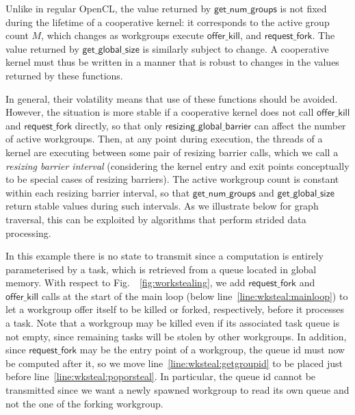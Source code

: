 \documentclass[parskip=half,sigconf,review, anonymous=true, acmcopyrightmode=none]{acmart}
\newcommand{\myfig}{Fig.~}
\newcommand{\offerfork}{\mathsf{request\_fork}}
\newcommand{\offerkill}{\mathsf{offer\_kill}}
\newcommand{\resizingglobalbarrier}{\mathsf{resizing\_global\_barrier}}
\newcommand{\getnumgroups}{\mathsf{get\_num\_groups}}
\newcommand{\getglobalsize}{\mathsf{get\_global\_size}}
\begin{document}
 Unlike in regular OpenCL, the
value returned by $\getnumgroups$ is not fixed during the lifetime of
a cooperative kernel: it corresponds to the active group count $M$,
which changes as workgroups execute $\offerkill$, and $\offerfork$.
The value returned by $\getglobalsize$ is similarly subject to change.
A cooperative kernel must thus be written in a manner that is robust
to changes in the values returned by these functions.

In general, their volatility means that use of these functions should
be avoided.  However, the situation is more stable if a cooperative
kernel does not call $\offerkill$ and $\offerfork$ directly, so that
only $\resizingglobalbarrier$ can affect the number of active
workgroups.  Then, at any point during execution, the threads of a
kernel are executing between some pair of resizing barrier calls,
which we call a \emph{resizing barrier interval} (considering the
kernel entry and exit points conceptually to be special cases of
resizing barriers).  The active workgroup count is constant within
each resizing barrier interval, so that $\getnumgroups$ and
$\getglobalsize$ return stable values during such intervals.
%
As we illustrate below for graph traversal, this can be exploited by algorithms that perform strided
data processing.


%
In this example there is no state to transmit since a computation is
entirely parameterised by a task, which is retrieved from a queue
located in global memory. With respect to \myfig~\ref{fig:workstealing},
we add $\offerfork$ and $\offerkill$ calls at the start of the main loop
(below line~\ref{line:wksteal:mainloop}) to let a workgroup offer itself
to be killed or forked, respectively, before it processes a task.  Note
that a workgroup may be killed even if its associated task queue is not
empty, since remaining tasks will be stolen by other workgroups. In
addition, since $\offerfork$ may be the entry point of a workgroup, the
queue id must now be computed after it, so we move
line~\ref{line:wksteal:getgroupid} to be placed just before
line~\ref{line:wksteal:poporsteal}. In particular, the queue id cannot
be transmitted since we want a newly spawned workgroup to read its own
queue and not the one of the forking workgroup.
\end{document}
